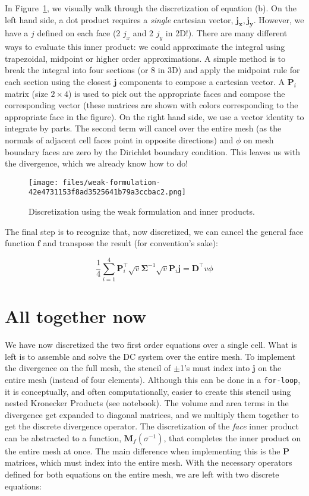 \documentclass[Journal,InsideFigs,DoubleSpace,12pt,letterpaper]{ascelike-new}
\begin{document}
In Figure~\ref{fig-weak-formulation}, we visually walk through the discretization of equation (b). On the left hand side, a dot product requires a \textit{single} cartesian vector, $\mathbf{j_x, j_y}$. However, we have a $j$ defined on each face (2 $j_x$ and 2 $j_y$ in 2D!). There are many different ways to evaluate this inner product: we could approximate the integral using trapezoidal, midpoint or higher order approximations. A simple method is to break the integral into four sections (or 8 in 3D) and apply the midpoint rule for each section using the closest $\mathbf{j}$ components to compose a cartesian vector. A $\mathbf{P}_i$ matrix (size $2 \times 4$) is used to pick out the appropriate faces and compose the corresponding vector (these matrices are shown with colors corresponding to the appropriate face in the figure). On the right hand side, we use a vector identity to integrate by parts. The second term will cancel over the entire mesh (as the normals of adjacent cell faces point in opposite directions) and $\phi$ on mesh boundary faces are zero by the Dirichlet boundary condition. This leaves us with the divergence, which we already know how to do!

\begin{figure}[!htbp]
\centering
\texttt{[image: files/weak-formulation-42e4731153f8ad3525641b79a3ccbac2.png]}
\caption{Discretization using the weak formulation and inner products.}
\label{fig-weak-formulation}
\end{figure}

The final step is to recognize that, now discretized, we can cancel the general face function $\mathbf{f}$ and transpose the result (for convention's sake):

\begin{equation}
\frac{1}{4} \sum_{i=1}^4 \mathbf{P}_i^\top \sqrt{v} \mathbf{\Sigma}^{-1} \sqrt{v} \mathbf{P}_i \mathbf{j} = \mathbf{D}^\top v \phi
\end{equation}

\section{All together now}\label{All together now}

We have now discretized the two first order equations over a single cell. What is left is to assemble and solve the DC system over the entire mesh. To implement the divergence on the full mesh, the stencil of $\pm$1's must index into $\mathbf{j}$ on the entire mesh (instead of four elements). Although this can be done in a \texttt{for-loop}, it is conceptually, and often computationally, easier to create this stencil using nested Kronecker Products (see notebook). The volume and area terms in the divergence get expanded to diagonal matrices, and we multiply them together to get the discrete divergence operator. The discretization of the \textit{face} inner product can be abstracted to a function, $\mathbf{M}_f(\sigma^{ -1})$, that completes the inner product on the entire mesh at once. The main difference when implementing this is the $\mathbf{P}$ matrices, which must index into the entire mesh. With the necessary operators defined for both equations on the entire mesh, we are left with two discrete equations:
\end{document}
